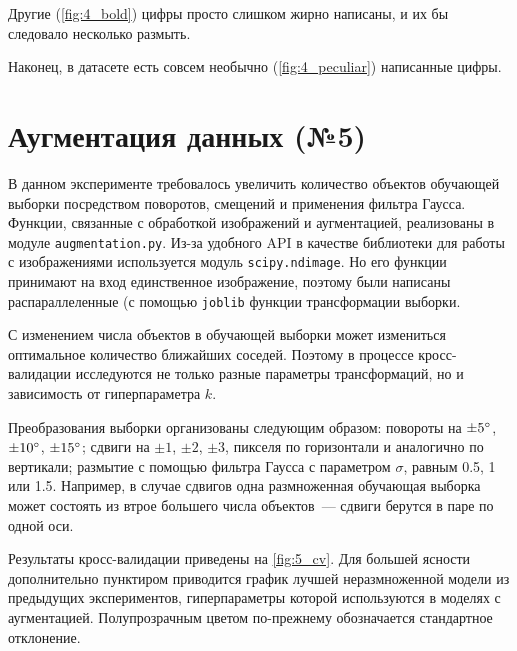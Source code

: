 \documentclass[12pt]{article}
\begin{document}
Другие (\autoref{fig:4_bold}) цифры просто слишком жирно написаны, и их бы следовало несколько размыть.


Наконец, в датасете есть совсем необычно (\autoref{fig:4_peculiar}) написанные цифры.

\section{Аугментация данных (№5)}

В данном эксперименте требовалось увеличить количество объектов обучающей выборки посредством поворотов, смещений и применения фильтра Гаусса. Функции, связанные с обработкой изображений и аугментацией, реализованы в модуле \verb|augmentation.py|. Из-за удобного API в качестве библиотеки для работы с изображениями используется модуль \verb|scipy.ndimage|. Но его функции принимают на вход единственное изображение, поэтому были написаны распараллеленные (с помощью \verb|joblib| функции трансформации выборки.

С изменением числа объектов в обучающей выборки может измениться оптимальное количество ближайших соседей. Поэтому в процессе кросс-валидации исследуются не только разные параметры трансформаций, но и зависимость от гиперпараметра $k$.

Преобразования выборки организованы следующим образом: повороты на $\pm5\degree$, $\pm10\degree$, $\pm15\degree$; сдвиги на $\pm1$, $\pm2$, $\pm3$, пикселя по горизонтали и аналогично по вертикали; размытие с помощью фильтра Гаусса с параметром $\sigma$, равным 0.5, 1 или 1.5. Например, в случае сдвигов одна размноженная обучающая выборка может состоять из втрое большего числа объектов~--- сдвиги берутся в паре по одной оси.

Результаты кросс-валидации приведены на \autoref{fig:5_cv}. Для большей ясности дополнительно пунктиром приводится график лучшей неразмноженной модели из предыдущих экспериментов, гиперпараметры которой используются в моделях с аугментацией. Полупрозрачным цветом по-прежнему обозначается стандартное отклонение.
\end{document}
